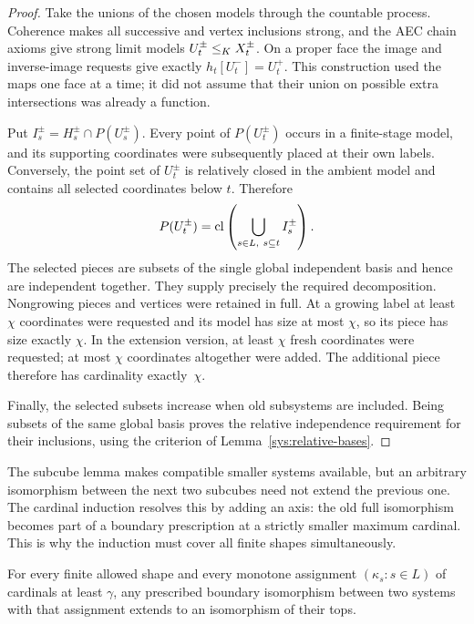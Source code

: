 \begin{proof}
Take the unions of the chosen models through the countable
process.  Coherence makes all successive and vertex inclusions
strong, and the AEC chain axioms give strong limit models
$U_t^\pm\leq_K X_t^\pm$.  On a proper face the image and
inverse-image requests give exactly $h_t[U_t^-]=U_t^+$.
This construction used the maps one face at a time; it did not
assume that their union on possible extra intersections was
already a function.

Put $I_s^\pm=H_s^\pm\cap P(U_s^\pm)$.  Every point of
$P(U_t^\pm)$ occurs in a finite-stage model, and its supporting
coordinates were subsequently placed at their own labels.
Conversely, the point set of $U_t^\pm$ is relatively closed in
the ambient model and contains all selected coordinates below
$t$.  Therefore
\[
 P(U_t^\pm)=\operatorname{cl}\left(\bigcup_{s\in L,\ s\subseteq t}
                                      I_s^\pm\right).
\]
The selected pieces are subsets of the single global independent
basis and hence are independent together.  They supply precisely
the required decomposition.  Nongrowing pieces and vertices were
retained in full.  At a growing label at least $\chi$ coordinates
were requested and its model has size at most $\chi$, so its
piece has size exactly $\chi$.  In the extension version, at
least $\chi$ fresh coordinates were requested; at most $\chi$
coordinates altogether were added.  The additional piece
therefore has cardinality exactly~$\chi$.

Finally, the selected subsets increase when old subsystems are
included.  Being subsets of the same global basis proves the
relative independence requirement for their inclusions, using
the criterion of Lemma~\ref{sys:relative-bases}.
\end{proof}

The subcube lemma makes compatible smaller systems available, but an
arbitrary isomorphism between the next two subcubes need not extend the
previous one.  The cardinal induction resolves this by adding an axis:
the old full isomorphism becomes part of a boundary prescription at a
strictly smaller maximum cardinal.  This is why the induction must cover
all finite shapes simultaneously.

\begin{theorem}
\label{tail:all-cardinals}
For every finite allowed shape and every monotone assignment
$(\kappa_s:s\in L)$ of cardinals at least $\gamma$, any prescribed
boundary isomorphism between two systems with that assignment
extends to an isomorphism of their tops.
\end{theorem}

